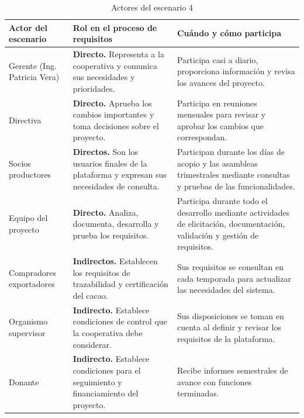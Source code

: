 \documentclass[12pt,a4paper]{article}
\renewcommand{\arraystretch}{1.3}
\begin{document}
\begin{table}[H]
\centering
\caption{Actores del escenario 4}
\label{tab:actores_escenario4}
\small
\renewcommand{\arraystretch}{1.1}
\setlength{\tabcolsep}{4pt}
\begin{tabularx}{\textwidth}{
    >{\raggedright\arraybackslash}p{2.8cm} Y Y
}
\toprule
\textbf{Actor del escenario} &
\textbf{Rol en el proceso de requisitos} &
\textbf{Cuándo y cómo participa} \\
\midrule

Gerente (Ing. Patricia Vera)
&
\textbf{Directo.} Representa a la cooperativa y comunica sus necesidades y prioridades.
&
Participa casi a diario, proporciona información y revisa los avances del proyecto.
\\
\midrule

Directiva
&
\textbf{Directo.} Aprueba los cambios importantes y toma decisiones sobre el proyecto.
&
Participa en reuniones mensuales para revisar y aprobar los cambios que correspondan.
\\
\midrule

Socios productores
&
\textbf{Directos.} Son los usuarios finales de la plataforma y expresan sus necesidades de consulta.
&
Participan durante los días de acopio y las asambleas trimestrales mediante consultas y pruebas de las funcionalidades.
\\
\midrule

Equipo del proyecto
&
\textbf{Directo.} Analiza, documenta, desarrolla y prueba los requisitos.
&
Participa durante todo el desarrollo mediante actividades de elicitación, documentación, validación y gestión de requisitos.
\\
\midrule

Compradores exportadores
&
\textbf{Indirectos.} Establecen los requisitos de trazabilidad y certificación del cacao.
&
Sus requisitos se consultan en cada temporada para actualizar las necesidades del sistema.
\\
\midrule

Organismo supervisor
&
\textbf{Indirecto.} Establece condiciones de control que la cooperativa debe considerar.
&
Sus disposiciones se toman en cuenta al definir y revisar los requisitos de la plataforma.
\\
\midrule

Donante
&
\textbf{Indirecto.} Establece condiciones para el seguimiento y financiamiento del proyecto.
&
Recibe informes semestrales de avance con funciones terminadas.
\\
\bottomrule
\end{tabularx}
\end{table}
\end{document}
